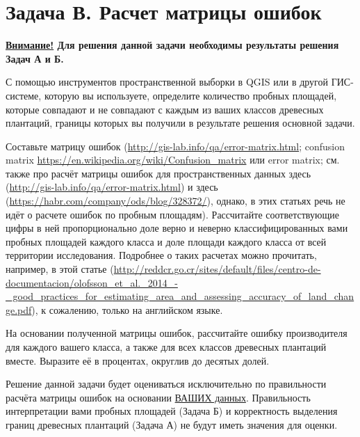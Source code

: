 \section{Задача В. Расчет матрицы ошибок}

\textbf{\underline{Внимание!} Для решения данной задачи необходимы результаты решения Задач А и Б.}

С помощью инструментов пространственной выборки в QGIS или в другой ГИС-системе, которую вы используете, определите количество пробных площадей, которые совпадают и не совпадают с каждым из ваших классов древесных плантаций, границы которых вы получили в результате решения основной задачи.

Составьте матрицу ошибок (\url{http://gis-lab.info/qa/error-matrix.html}; \linebreak confusion matrix \url{https://en.wikipedia.org/wiki/Confusion_matrix} или error matrix; см. также про расчёт матрицы ошибок для пространственных данных здесь (\url{http://gis-lab.info/qa/error-matrix.html}) и здесь (\url{https://habr.com/company/ods/blog/328372/}), однако, в этих статьях речь не идёт о расчете ошибок по пробным площадям). Рассчитайте соответствующие цифры в ней пропорционально доле верно и неверно классифицированных вами пробных площадей каждого класса и доле площади каждого класса от всей территории исследования. Подробнее о таких расчетах можно прочитать, например, в этой статье (\url{http://reddcr.go.cr/sites/default/files/centro-de-documentacion/olofsson_et_al._2014_-_good_practices_for_es}\linebreak \url{timating_area_and_assessing_accuracy_of_land_change.pdf}), к сожалению, только на английском языке.

На основании полученной матрицы ошибок, рассчитайте ошибку производителя для каждого вашего класса, а также для всех классов древесных плантаций вместе. Выразите её в процентах, округлив до десятых долей.

Решение данной задачи будет оцениваться исключительно по правильности расчёта матрицы ошибок на основании \underline{ВАШИХ данных}. Правильность интерпретации вами пробных площадей (Задача Б) и корректность выделения границ древесных плантаций (Задача А) не будут иметь значения для оценки.
